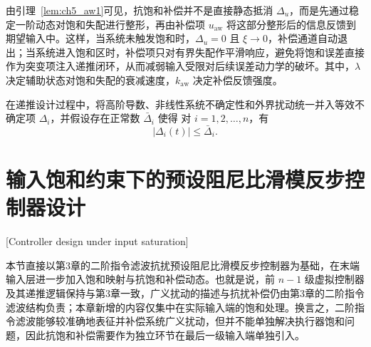 由引理~\ref{lem:ch5_aw1}可见，抗饱和补偿并不是直接静态抵消 $\Delta_u$，而是先通过稳定一阶动态对饱和失配进行整形，再由补偿项 $u_{\mathrm{aw}}$ 将这部分整形后的信息反馈到期望输入中。这样，当系统未触发饱和时，$\Delta_u=0$ 且 $\xi\to 0$，补偿通道自动退出；当系统进入饱和区时，补偿项只对有界失配作平滑响应，避免将饱和误差直接作为突变项注入递推闭环，从而减弱输入受限对后续误差动力学的破坏。其中，$\lambda$ 决定辅助状态对饱和失配的衰减速度，$k_{\mathrm{aw}}$ 决定补偿反馈强度。

在递推设计过程中，将高阶导数、非线性系统不确定性和外界扰动统一并入等效不确定项 $\Delta_i$，并假设存在正常数 $\bar\Delta_i$ 使得
对 $i=1,2,\ldots,n$，有
\begin{equation}\label{eq:ch5_delta}
  |\Delta_i(t)|\le \bar\Delta_i.
\end{equation}

\section{输入饱和约束下的预设阻尼比滑模反步控制器设计}[Controller design under input saturation]

本节直接以第3章的二阶指令滤波抗扰预设阻尼比滑模反步控制器为基础，在末端输入层进一步加入饱和映射与抗饱和补偿动态。也就是说，前 $n-1$ 级虚拟控制器及其递推逻辑保持与第3章一致，广义扰动的描述与抗扰补偿仍由第3章的二阶指令滤波结构负责；本章新增的内容仅集中在实际输入端的饱和处理。换言之，二阶指令滤波能够较准确地表征并补偿系统广义扰动，但并不能单独解决执行器饱和问题，因此抗饱和补偿需要作为独立环节在最后一级输入端单独引入。

